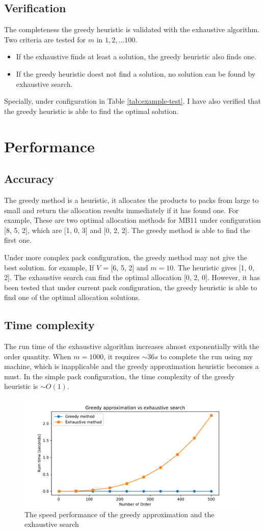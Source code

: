\documentclass[a4paper]{article}
\begin{document}
\subsection{Verification}

The completeness the greedy heuristic is validated with the exhaustive algorithm. Two criteria are tested for $m$ in $1, 2, ... 100$.
\begin{itemize}
\item If the exhaustive finds at least a solution, the greedy heuristic also finds one. \item If the greedy heuristic doest not find a solution, no solution can be found by exhaustive search.
\end{itemize}

Specially, under configuration in Table {\ref{tab:example-test}}. I have also verified that the greedy heuristic is able to find the optimal solution.


\section{Performance}

\subsection{Accuracy}

The greedy method is a heuristic, it allocates the products to packs from large to small and return the allocation results immediately if it has found one. For example, These are two optimal allocation methods for MB11 under configuration [8, 5, 2], which are [1, 0, 3] and [0, 2, 2]. The greedy method is able to find the first one.

Under more complex pack configuration, the greedy method may not give the best solution. for example, If $V$ = [6, 5, 2] and $m=10$. The heuristic gives [1, 0, 2]. The exhaustive search can find the optimal allocation [0, 2, 0]. However, it has been tested that under current pack configuration, the greedy heuristic is able to find one of the optimal allocation solutions.

\subsection{Time complexity}
The run time of the exhaustive algorithm increases almost exponentially with the order quantity. When $m=1000$, it requires $\sim 36s$ to complete the run using my machine, which is inapplicable and the greedy approximation heuristic becomes a must. In the simple pack configuration, the time complexity of the greedy heuristic is $\sim O(1)$.

\begin{figure}
    \includegraphics[width=\textwidth]{./comparison.pdf}
    \caption{The speed performance of the greedy approximation and the exhaustive search}
\end{figure}
\end{document}
